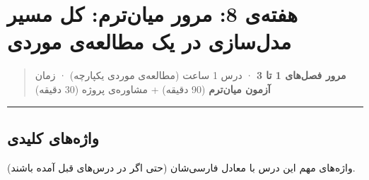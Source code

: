 \section{هفته‌ی 8: مرور میان‌ترم: کل مسیر مدل‌سازی در یک مطالعه‌ی موردی}

\begin{quote}
\textbf{مرور فصل‌های 1 تا 3} · درس 1 ساعت (مطالعه‌ی موردی یکپارچه) · زمان
 \textbf{آزمون میان‌ترم} (90 دقیقه) + مشاوره‌ی پروژه (30 دقیقه)
\end{quote}

\begin{center}\rule{0.5\linewidth}{0.5pt}\end{center}

\subsection{واژه‌های کلیدی}

واژه‌های مهم این درس با معادل فارسی‌شان (حتی اگر در درس‌های قبل آمده
باشند).

